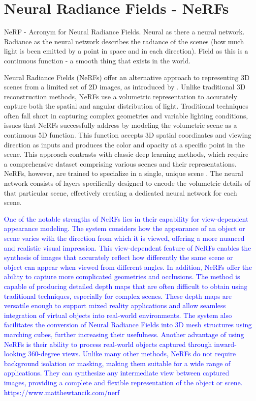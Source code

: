 \section{Neural Radiance Fields - NeRFs}
\label{NeRF}

NeRF - Acronym for Neural Radiance Fields. Neural as there a neural network. Radiance as the neural network describes the radiance of the scenes (how much light is been emitted by a point in space and in each direction). Field as this is a continuous function - a smooth thing that exists in the world. 

Neural Radiance Fields (NeRFs) \citep{mildenhallNERF} offer an alternative approach to representing 3D scenes from a limited set of 2D images, as introduced by \citeauthor{mildenhallNERF}. Unlike traditional 3D reconstruction methods, NeRFs use a volumetric representation to accurately capture both the spatial and angular distribution of light. Traditional techniques often fall short in capturing complex geometries and variable lighting conditions, issues that NeRFs successfully address by modeling the volumetric scene as a continuous 5D function. This function accepts 3D spatial coordinates and viewing direction as inputs and produces the color and opacity at a specific point in the scene.
This approach contrasts with classic deep learning methods, which require a comprehensive dataset comprising various scenes and their representations. NeRFs, however, are trained to specialize in a single, unique scene \citep{mildenhallNERF}. The neural network consists of layers specifically designed to encode the volumetric details of that particular scene, effectively creating a dedicated neural network for each scene.

\textcolor{blue}{One of the notable strengths of NeRFs lies in their capability for view-dependent appearance modeling. The system considers how the appearance of an object or scene varies with the direction from which it is viewed, offering a more nuanced and realistic visual impression. This view-dependent feature of NeRFs enables the synthesis of images that accurately reflect how differently the same scene or object can appear when viewed from different angles. In addition, NeRFs offer the ability to capture more complicated geometries and occlusions. The method is capable of producing detailed depth maps that are often difficult to obtain using traditional techniques, especially for complex scenes. These depth maps are versatile enough to support mixed reality applications and allow seamless integration of virtual objects into real-world environments. The system also facilitates the conversion of Neural Radiance Fields into 3D mesh structures using marching cubes, further increasing their usefulness. Another advantage of using NeRFs is their ability to process real-world objects captured through inward-looking 360-degree views. Unlike many other methods, NeRFs do not require background isolation or masking, making them suitable for a wide range of applications. They can synthesize any intermediate view between captured images, providing a complete and flexible representation of the object or scene.
https://www.matthewtancik.com/nerf}

